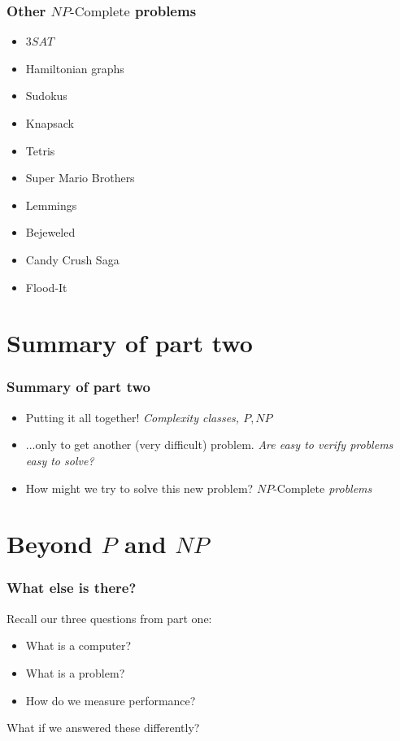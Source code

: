 \documentclass[aspectratio=169]{beamer}
\begin{document}
\begin{frame}
\frametitle{Other $NP\text{-Complete}$ problems}
\begin{itemize}
    \item<1-> $3SAT$
    \item<2-> Hamiltonian graphs
    \item<3-> Sudokus
    \item<4-> Knapsack
    \item<5-> Tetris
    \item<6-> Super Mario Brothers
    \item<7-> Lemmings
    \item<8-> Bejeweled
    \item<9-> Candy Crush Saga
    \item<10-> Flood-It
\end{itemize}
\end{frame}

\section{Summary of part two}

\begin{frame}
\frametitle{Summary of part two}
\begin{itemize}
    \item Putting it all together! {\em Complexity classes, $P, NP$}
    \item ...only to get another (very difficult) problem. {\em Are easy to verify problems easy to solve?}
    \item How might we try to solve this new problem? {\em $NP\text{-Complete}$ problems}
\end{itemize}
\end{frame}

\section{Beyond $P$ and $NP$}

\begin{frame}
\frametitle{What else is there?}
Recall our three questions from part one:
\begin{itemize}
    \item What is a computer?
    \item What is a problem?
    \item How do we measure performance?
\end{itemize}
What if we answered these differently?
\end{frame}
\end{document}
